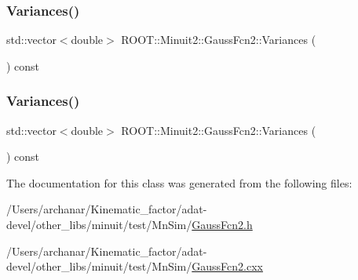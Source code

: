 \subsubsection{\texorpdfstring{Variances()}{Variances()}\hspace{0.1cm}{\footnotesize\ttfamily [1/2]}}
{\footnotesize\ttfamily std\+::vector$<$double$>$ R\+O\+O\+T\+::\+Minuit2\+::\+Gauss\+Fcn2\+::\+Variances (\begin{DoxyParamCaption}{ }\end{DoxyParamCaption}) const\hspace{0.3cm}{\ttfamily [inline]}}

\mbox{\label{classROOT_1_1Minuit2_1_1GaussFcn2_ae14a0349f83e8ffe7b2b1cda4e138113}} 
\subsubsection{\texorpdfstring{Variances()}{Variances()}\hspace{0.1cm}{\footnotesize\ttfamily [2/2]}}
{\footnotesize\ttfamily std\+::vector$<$double$>$ R\+O\+O\+T\+::\+Minuit2\+::\+Gauss\+Fcn2\+::\+Variances (\begin{DoxyParamCaption}{ }\end{DoxyParamCaption}) const\hspace{0.3cm}{\ttfamily [inline]}}



The documentation for this class was generated from the following files\+:\begin{DoxyCompactItemize}
\item 
/\+Users/archanar/\+Kinematic\+\_\+factor/adat-\/devel/other\+\_\+libs/minuit/test/\+Mn\+Sim/\mbox{\hyperlink{adat-devel_2other__libs_2minuit_2test_2MnSim_2GaussFcn2_8h}{Gauss\+Fcn2.\+h}}\item 
/\+Users/archanar/\+Kinematic\+\_\+factor/adat-\/devel/other\+\_\+libs/minuit/test/\+Mn\+Sim/\mbox{\hyperlink{adat-devel_2other__libs_2minuit_2test_2MnSim_2GaussFcn2_8cxx}{Gauss\+Fcn2.\+cxx}}\end{DoxyCompactItemize}
